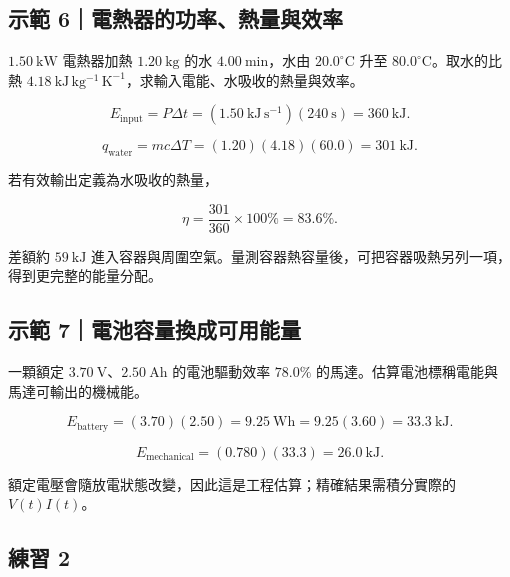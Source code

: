 \documentclass[11pt,a4paper]{article}
\begin{document}
\begin{HandoutWorkedExample}

\subsection{示範 6｜電熱器的功率、熱量與效率}\label{ux793aux7bc4-6ux96fbux71b1ux5668ux7684ux529fux7387ux71b1ux91cfux8207ux6548ux7387}

\(1.50\ \mathrm{kW}\) 電熱器加熱 \(1.20\ \mathrm{kg}\) 的水 \(4.00\ \mathrm{min}\)，水由 \(20.0^\circ\mathrm C\) 升至 \(80.0^\circ\mathrm C\)。取水的比熱 \(4.18\ \mathrm{kJ\,kg^{-1}\,K^{-1}}\)，求輸入電能、水吸收的熱量與效率。

\[
E_{\text{input}}=P\Delta t=(1.50\ \mathrm{kJ\,s^{-1}})(240\ \mathrm s)=360\ \mathrm{kJ}.
\]

\[
q_{\text{water}}=mc\Delta T=(1.20)(4.18)(60.0)=301\ \mathrm{kJ}.
\]

若有效輸出定義為水吸收的熱量，

\[
\eta=\frac{301}{360}\times100\%=83.6\%.
\]

差額約 \(59\ \mathrm{kJ}\) 進入容器與周圍空氣。量測容器熱容量後，可把容器吸熱另列一項，得到更完整的能量分配。

\end{HandoutWorkedExample}

\begin{HandoutWorkedExample}

\subsection{示範 7｜電池容量換成可用能量}\label{ux793aux7bc4-7ux96fbux6c60ux5bb9ux91cfux63dbux6210ux53efux7528ux80fdux91cf}

一顆額定 \(3.70\ \mathrm V\)、\(2.50\ \mathrm{Ah}\) 的電池驅動效率 \(78.0\%\) 的馬達。估算電池標稱電能與馬達可輸出的機械能。

\[
E_{\text{battery}}=(3.70)(2.50)=9.25\ \mathrm{Wh}
=9.25(3.60)=33.3\ \mathrm{kJ}.
\]

\[
E_{\text{mechanical}}=(0.780)(33.3)=26.0\ \mathrm{kJ}.
\]

額定電壓會隨放電狀態改變，因此這是工程估算；精確結果需積分實際的 \(V(t)I(t)\)。

\end{HandoutWorkedExample}

\subsection{練習 2}\label{ux7df4ux7fd2-2}
\end{document}
